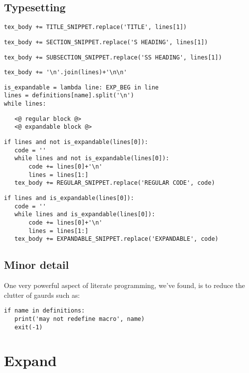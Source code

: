 \documentclass{article}
\begin{document}
\subsection{Typesetting}

{\color{YellowOrange}\begin{verbatim}tex_body += TITLE_SNIPPET.replace('TITLE', lines[1])
\end{verbatim}}{\color{YellowOrange}\begin{verbatim}tex_body += SECTION_SNIPPET.replace('S HEADING', lines[1])
\end{verbatim}}{\color{YellowOrange}\begin{verbatim}tex_body += SUBSECTION_SNIPPET.replace('SS HEADING', lines[1])
\end{verbatim}}{\color{YellowOrange}\begin{verbatim}tex_body += '\n'.join(lines)+'\n\n'
\end{verbatim}}{\color{YellowOrange}\begin{verbatim}is_expandable = lambda line: EXP_BEG in line
lines = definitions[name].split('\n')
while lines:
\end{verbatim}}{\color{MidnightBlue}\begin{verbatim}   <@ regular block @>
   <@ expandable block @>
\end{verbatim}}
{\color{YellowOrange}\begin{verbatim}if lines and not is_expandable(lines[0]):
   code = ''
   while lines and not is_expandable(lines[0]):
       code += lines[0]+'\n'
       lines = lines[1:]
   tex_body += REGULAR_SNIPPET.replace('REGULAR CODE', code)
\end{verbatim}}{\color{YellowOrange}\begin{verbatim}if lines and is_expandable(lines[0]):
   code = ''
   while lines and is_expandable(lines[0]):
       code += lines[0]+'\n'
       lines = lines[1:]
   tex_body += EXPANDABLE_SNIPPET.replace('EXPANDABLE', code)
\end{verbatim}}\subsection{Minor detail}

One very powerful aspect of literate programming, we've found, is to reduce the
clutter of gaurds such as:

{\color{YellowOrange}\begin{verbatim}if name in definitions:
   print('may not redefine macro', name)
   exit(-1)
\end{verbatim}}\section{Expand}
\end{document}
